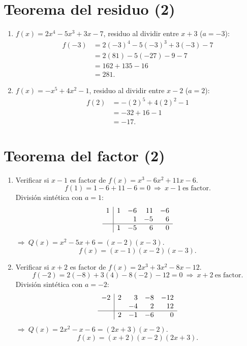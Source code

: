 \documentclass[14pt]{extarticle}
\begin{document}
	\section*{Teorema del residuo (2)}
	\begin{enumerate}[label=(\arabic*), start=9]
		\item \(f(x)=2x^{4}-5x^{3}+3x-7\), residuo al dividir entre \(x+3\) (\(a=-3\)):
		\[
		\begin{aligned}
			f(-3)&=2(-3)^{4}-5(-3)^{3}+3(-3)-7\\
			&=2(81)-5(-27)-9-7\\
			&=162+135-16\\
			&=\boxed{281}.
		\end{aligned}
		\]
		
		\item \(f(x)=-x^{5}+4x^{2}-1\), residuo al dividir entre \(x-2\) (\(a=2\)):
		\[
		\begin{aligned}
			f(2)&=-(2)^{5}+4(2)^{2}-1\\
			&=-32+16-1\\
			&=\boxed{-17}.
		\end{aligned}
		\]
	\end{enumerate}
	
	\section*{Teorema del factor (2)}
	\begin{enumerate}[label=(\arabic*), start=11]
		\item Verificar si \(x-1\) es factor de \(f(x)=x^{3}-6x^{2}+11x-6\).
		\[
		f(1)=1-6+11-6=0\ \Rightarrow\ \boxed{x-1\ \text{es factor}}.
		\]
		División sintética con \(a=1\):
		\[
		\begin{array}{r|rrrr}
			1 & 1 & -6 & 11 & -6\\
			&   &  1 & -5 & 6\\ \hline
			& 1 & -5 &  6 & 0
		\end{array}
		\]
		\(\Rightarrow\ Q(x)=x^{2}-5x+6=(x-2)(x-3)\).
		\[
		\boxed{f(x)=(x-1)(x-2)(x-3)}.
		\]
		
		\item Verificar si \(x+2\) es factor de \(f(x)=2x^{3}+3x^{2}-8x-12\).
		\[
		f(-2)=2(-8)+3(4)-8(-2)-12=0\ \Rightarrow\ \boxed{x+2\ \text{es factor}}.
		\]
		División sintética con \(a=-2\):
		\[
		\begin{array}{r|rrrr}
			-2 & 2 & 3 & -8 & -12\\
			&   & -4 & 2 & 12\\ \hline
			& 2 & -1 & -6 & 0
		\end{array}
		\]
		\(\Rightarrow\ Q(x)=2x^{2}-x-6=(2x+3)(x-2)\).
		\[
		\boxed{f(x)=(x+2)(x-2)(2x+3)}.
		\]
	\end{enumerate}
	
\end{document}
